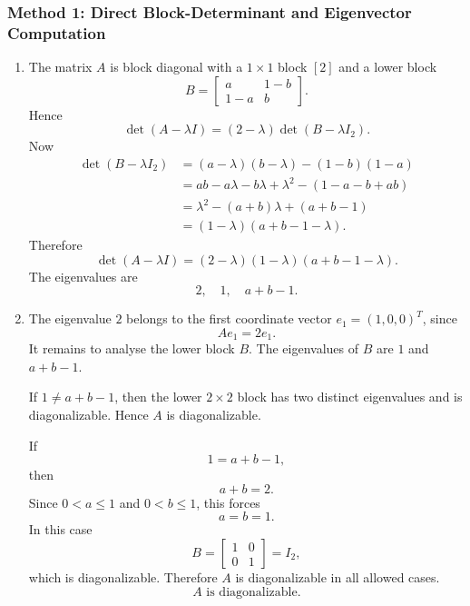 \documentclass[12pt]{article}
\begin{document}
\subsubsection{Method 1: Direct Block-Determinant and Eigenvector Computation}
\begin{enumerate}[label=(\alph*)]
  \item The matrix $A$ is block diagonal with a $1\times1$ block $[2]$ and a lower block
  \[
  B=\begin{bmatrix}a&1-b\\1-a&b\end{bmatrix}.
  \]
  Hence
  \[
  \det(A-\lambda I)=(2-\lambda)\det(B-\lambda I_2).
  \]
  Now
  \begin{align*}
  \det(B-\lambda I_2)
  &=(a-\lambda)(b-\lambda)-(1-b)(1-a)\\
  &=ab-a\lambda-b\lambda+\lambda^2-(1-a-b+ab)\\
  &=\lambda^2-(a+b)\lambda+(a+b-1)\\
  &=(1-\lambda)(a+b-1-\lambda).
  \end{align*}
  Therefore
  \[
  \boxed{\det(A-\lambda I)=(2-\lambda)(1-\lambda)(a+b-1-\lambda).}
  \]
  The eigenvalues are
  \[
  \boxed{2,\quad 1,\quad a+b-1.}
  \]

  \item The eigenvalue $2$ belongs to the first coordinate vector $e_1=(1,0,0)^T$, since
  \[
  Ae_1=2e_1.
  \]
  It remains to analyse the lower block $B$. The eigenvalues of $B$ are $1$ and $a+b-1$.

  If $1\ne a+b-1$, then the lower $2\times2$ block has two distinct eigenvalues and is diagonalizable. Hence $A$ is diagonalizable.

  If
  \[
  1=a+b-1,
  \]
  then
  \[
  a+b=2.
  \]
  Since $0<a\le1$ and $0<b\le1$, this forces
  \[
  a=b=1.
  \]
  In this case
  \[
  B=\begin{bmatrix}1&0\\0&1\end{bmatrix}=I_2,
  \]
  which is diagonalizable. Therefore $A$ is diagonalizable in all allowed cases.
  \[
  \boxed{A\text{ is diagonalizable}.}
  \]


\end{enumerate}
\end{document}
